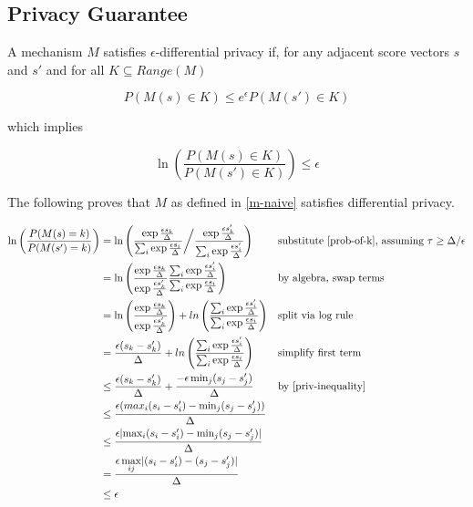 \subsection{Privacy Guarantee}
\label{privacy-guarantee}
A mechanism $M$ satisfies $\epsilon$-differential privacy if, for any adjacent score vectors $s$ and $s'$ and for all $K \subseteq Range(M)$

\begin{equation}
    P(M(s) \in K) \leq e^\epsilon P(M(s') \in K)
\end{equation}

which implies

\begin{equation}
    \label{ln-defn}
    \ln\left(\frac{P(M(s) \in K)}{P(M(s') \in K)}\right)  \leq \epsilon
\end{equation}

The following proves that $M$ as defined in \ref{m-naive} satisfies differential privacy.

\begin{align*}
    \ln\left(\frac{P(M(s) = k)}{P(M(s') = k)}\right) &= \ln \left(
        \frac
            {\exp{\frac{\epsilon s_k}{\Delta}}}
            {\sum_{i} \exp{\frac{\epsilon s_i}{\Delta}}
        }
        \bigg/ \frac
            {\exp{\frac{\epsilon s'_k}{\Delta}}}
            {\sum_{i} \exp{\frac{\epsilon s'_i}{\Delta}}} \right)
        &&\text{substitute \ref{prob-of-k}, assuming } \tau \geq \Delta / \epsilon \\
    &= \ln \left(\frac
        {\exp{\frac{\epsilon s_k}{\Delta}}}{\exp{\frac{\epsilon s'_k}{\Delta}}}
        \frac{\sum_{i} \exp{\frac{\epsilon s'_i}{\Delta}}}{\sum_{i} \exp{\frac{\epsilon s_i}{\Delta}}}\right) &&\text{by algebra, swap terms} \\
    &= \ln \left(\frac
        {\exp{\frac{\epsilon s_k}{\Delta}}}{\exp{\frac{\epsilon s'_k}{\Delta}}}\right) + ln \left(
        \frac{\sum_{i} \exp{\frac{\epsilon s'_i}{\Delta}}}{\sum_{i} \exp{\frac{\epsilon s_i}{\Delta}}}\right)  &&\text{split via log rule}\\
    &= \frac{\epsilon (s_k - s'_k)}{\Delta} 
        + ln\left(\frac{\sum_{i} \exp{\frac{\epsilon s'_i}{\Delta}}}{\sum_{i} \exp{\frac{\epsilon s_i}{\Delta}}}\right) &&\text{simplify first term} \\
    &\leq \frac{\epsilon (s_k - s'_k)}{\Delta} + \frac{-\epsilon \min_j (s_j - s'_j)}{\Delta} &&\text{by \ref{priv-inequality}} \\
    &\leq \frac{\epsilon (max_i(s_i - s'_i) - \min_j (s_j - s'_j))}{\Delta} \\
    &\leq \frac{\epsilon \lvert\max_i (s_i - s'_i) - \min_j(s_j - s'_j)\rvert}{\Delta} \\
    &= \frac{\epsilon\max\limits_{ij} \lvert(s_i - s'_i) - (s_j - s'_j)\rvert}{\Delta} \\
    &\leq \epsilon
\end{align*}

